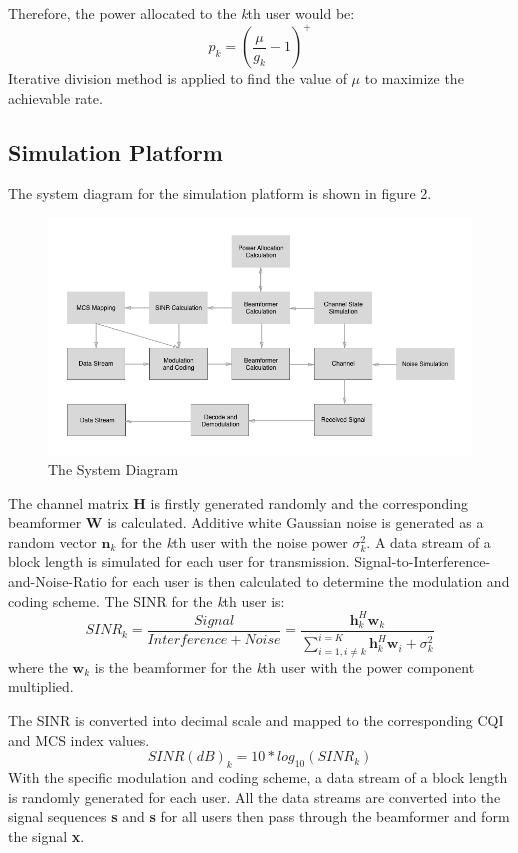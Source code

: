 \documentclass{article}
\begin{document}
\noindent
Therefore, the power allocated to the \textit{k}th user would be:
\[p_k = (\frac{\mu}{g_k}-1)^+ \]
Iterative division method is applied to find the value of $\mu$ to maximize the achievable rate.

\subsection{Simulation Platform}
The system diagram for the simulation platform is shown in figure 2.
\begin{figure}[ht]
\centering
\includegraphics[scale=0.5]{SystemDia.png}
\caption{The System Diagram}
\label{fig:SystemDia}
\end{figure}

\noindent
The channel matrix \textbf{H} is firstly generated randomly and the corresponding beamformer \textbf{W} is calculated.
Additive white Gaussian noise is generated as a random vector $\textbf{n}_k$ for the \textit{k}th user with the noise power $\sigma^2_k$.
A data stream of a block length is simulated for each user for transmission.
Signal-to-Interference-and-Noise-Ratio for each user is then calculated to determine the modulation and coding scheme.
The SINR for the \textit{k}th user is:
\[
SINR_k = \frac{Signal}{Interference+Noise} = \frac{\textbf{h}_k^H\textbf{w}_k}{\sum_{i = 1,i\neq k}^{i = K}\textbf{h}_k^H\textbf{w}_i+\sigma_k^2}
\]
where the $\textbf{w}_k$ is the beamformer for the \textit{k}th user with the power component multiplied.

\noindent
The SINR is converted into decimal scale and mapped to the corresponding CQI and MCS index values.
$$SINR(dB)_k = 10*log_{10}(SINR_k)$$
With the specific modulation and coding scheme, a data stream of a block length is randomly generated for each user.
All the data streams are converted into the signal sequences \textbf{s}
and \textbf{s} for all users then pass through the beamformer and form the signal \textbf{x}.
\end{document}

